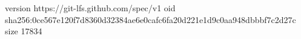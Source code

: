 version https://git-lfs.github.com/spec/v1
oid sha256:0ce567e120f7d8360d32384ae6e0cafc6fa20d221e1d9c0aa948dbbbf7c2d27c
size 17834
